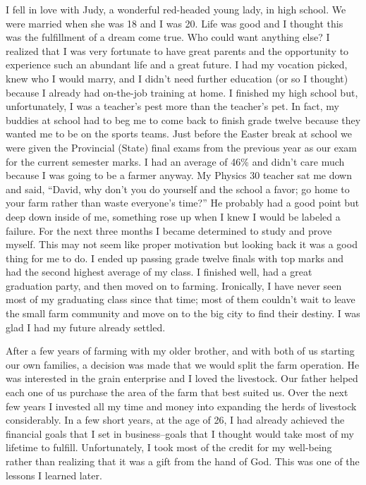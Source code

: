 \documentclass[oneside]{book}
\begin{document}
I fell in love with Judy, a wonderful red-headed young lady, in high school. We were married when she was 18 and I was 20. Life was good and I thought this was the fulfillment of a dream come true. Who could want anything else? I realized that I was very fortunate to have great parents and the opportunity to experience such an abundant life and a great future. I had my vocation picked, knew who I would marry, and I didn't need further education (or so I thought) because I already had on-the-job training at home. I finished my high school but, unfortunately, I was a teacher's pest more than the teacher's pet. In fact, my buddies at school had to beg me to come back to finish grade twelve because they wanted me to be on the sports teams. Just before the Easter break at school we were given the Provincial (State) final exams from the previous year as our exam for the current semester marks. I had an average of 46\% and didn't care much because I was going to be a farmer anyway. My Physics 30 teacher sat me down and said, “David, why don't you do yourself and the school a favor; go home to your farm rather than waste everyone's time?” He probably had a good point but deep down inside of me, something rose up when I knew I would be labeled a failure. For the next three months I became determined to study and prove myself. This may not seem like proper motivation but looking back it was a good thing for me to do. I ended up passing grade twelve finals with top marks and had the second highest average of my class. I finished well, had a great graduation party, and then moved on to farming. Ironically, I have never seen most of my graduating class since that time; most of them couldn't wait to leave the small farm community and move on to the big city to find their destiny. I was glad I had my future already settled.

After a few years of farming with my older brother, and with both of us starting our own families, a decision was made that we would split the farm operation. He was interested in the grain enterprise and I loved the livestock. Our father helped each one of us purchase the area of the farm that best suited us. Over the next few years I invested all my time and money into expanding the herds of livestock considerably. In a few short years, at the age of 26, I had already achieved the financial goals that I set in business--goals that I thought would take most of my lifetime to fulfill. Unfortunately, I took most of the credit for my well-being rather than realizing that it was a gift from the hand of God. This was one of the lessons I learned later. 
\end{document}

